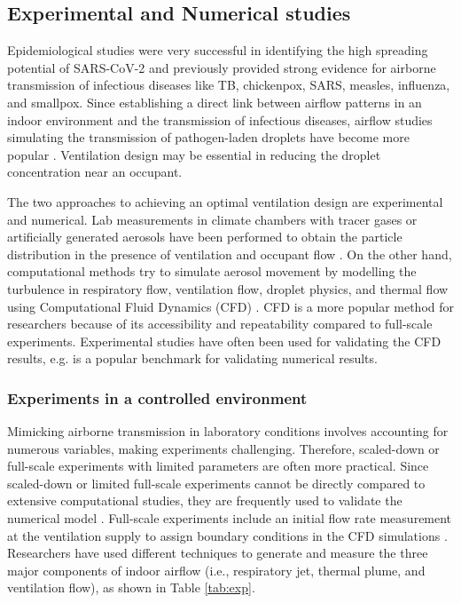 \documentclass[a4paper,12pt]{elsarticle}
\begin{document}
\subsection{Experimental and Numerical studies}

Epidemiological studies were very successful in identifying the high spreading potential of SARS-CoV-2 \cite{rothan2020epidemiology} and previously provided strong evidence for airborne transmission of infectious diseases like TB, chickenpox, SARS, measles, influenza, and smallpox. Since establishing a direct link between airflow patterns in an indoor environment and the transmission of infectious diseases, airflow studies simulating the transmission of pathogen-laden droplets have become more popular \cite{li2007role}. Ventilation design may be essential in reducing the droplet concentration near an occupant. 

The two approaches to achieving an optimal ventilation design are experimental and numerical. Lab measurements in climate chambers with tracer gases or artificially generated aerosols have been performed to obtain the particle distribution in the presence of ventilation and occupant flow \cite{zhou2021experimental}. On the other hand, computational methods try to simulate aerosol movement by modelling the turbulence in respiratory flow, ventilation flow, droplet physics, and thermal flow using Computational Fluid Dynamics (CFD) \cite{wang2022evaluation}. CFD is a more popular method for researchers because of its accessibility and repeatability compared to full-scale experiments. Experimental studies have often been used for validating the CFD results, e.g. \cite{yin2009experimental} is a popular benchmark for validating numerical results.

\subsubsection{Experiments in a controlled environment}

Mimicking airborne transmission in laboratory conditions involves accounting for numerous variables, making experiments challenging. Therefore, scaled-down \cite{poussou2010flow} or full-scale experiments with limited parameters \cite{luo2022role} are often more practical. Since scaled-down or limited full-scale experiments cannot be directly compared to extensive computational studies, they are frequently used to validate the numerical model \cite{li2020investigating,qin2023transmission,cortellessa2023effectiveness}. Full-scale experiments include an initial flow rate measurement at the ventilation supply to assign boundary conditions in the CFD simulations \cite{romano2015numerical}. Researchers have used different techniques to generate and measure the three major components of indoor airflow (i.e., respiratory jet, thermal plume, and ventilation flow), as shown in Table \ref{tab:exp}.
\end{document}
